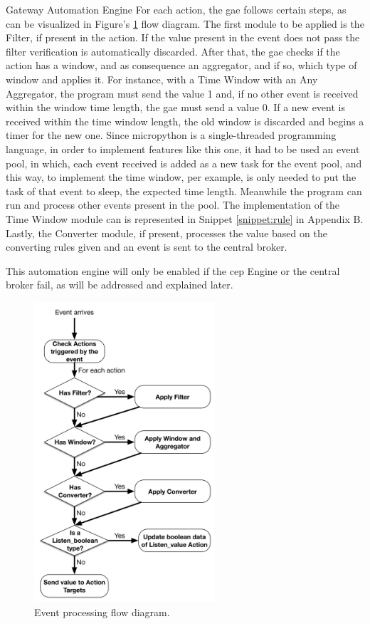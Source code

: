 \begin{Paragraph}{Gateway Automation Engine}
For each action, the \ac{gae} follows certain steps, as can be visualized in Figure's \ref{fig:action} flow diagram. The first module to be applied is the Filter, if present in the action. If the value present in the event does not pass the filter verification is automatically discarded. After that, the \ac{gae} checks if the action has a window, and as consequence an aggregator, and if so, which type of window and applies it. For instance, with a Time Window with an Any Aggregator, the program must send the value 1 and, if no other event is received within the window time length, the \ac{gae} must send a value 0. If a new event is received within the time window length, the old window is discarded and begins a timer for the new one. Since micropython is a single-threaded programming language, in order to implement features like this one, it had to be used an event pool, in which, each event received is added as a new task for the event pool, and this way, to implement the time window, per example, is only needed to put the task of that event to sleep, the expected time length. Meanwhile the program can run and process other events present in the pool. The implementation of the Time Window module can is represented in Snippet \ref{snippet:rule} in Appendix B. Lastly, the Converter module, if present, processes the value based on the converting rules given and an event is sent to the central broker. 

This automation engine will only be enabled if the \ac{cep} Engine or the central broker fail, as will be addressed and explained later.

\begin{figure}[]
	\centering
	\includegraphics[width=0.6\textwidth]{figures/action.png}
	\caption{Event processing flow diagram.}
	\label{fig:action}
\end{figure}

\end{Paragraph}

